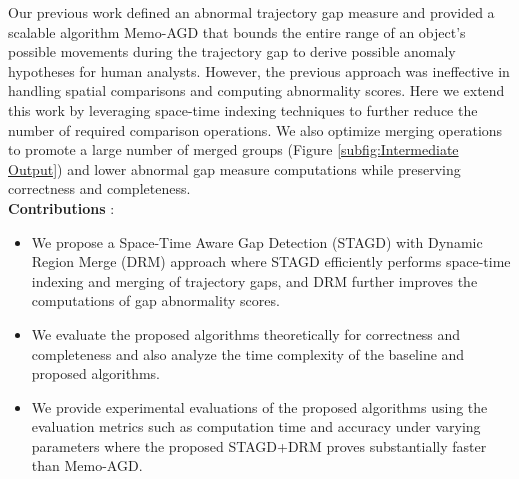 \documentclass[acmsmall]{acmart}
\begin{document}
Our previous work defined an abnormal trajectory gap measure and provided a scalable algorithm Memo-AGD \cite{sharma2022abnormal} that bounds the entire range of an object's possible movements during the trajectory gap to derive possible anomaly hypotheses for human analysts. However, the previous approach was ineffective in handling spatial comparisons and computing abnormality scores. Here we extend this work by leveraging space-time indexing techniques to further reduce the number of required comparison operations. We also optimize merging operations to promote a large number of merged groups (Figure \ref{subfig:Intermediate Output}) and lower abnormal gap measure computations while preserving correctness and completeness. \\

\textbf{Contributions} : 
\begin{itemize}
\item We propose a Space-Time Aware Gap Detection (STAGD) with Dynamic Region Merge (DRM) approach where STAGD efficiently performs space-time indexing and merging of trajectory gaps, and DRM further improves the computations of gap abnormality scores.

\item We evaluate the proposed algorithms theoretically for correctness and completeness and also analyze the time complexity of the baseline and proposed algorithms.

\item We provide experimental evaluations of the proposed algorithms using the evaluation metrics such as computation time and accuracy under varying parameters where the proposed STAGD+DRM proves substantially faster than Memo-AGD.
\end{itemize}
\end{document}
